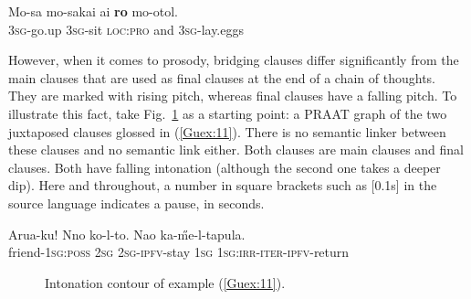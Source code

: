 \documentclass[output=paper]{LSP/langsci}
\begin{document}
\begin{exe}
\ex \label{Guex:10}
\gll Mo-sa    mo-sakai  ai \textbf{ro}  mo-otol.\\     	       
\textsc{3sg}-go.up \textsc{3sg}-sit \textsc{loc:pro}  and   \textsc{3sg}-lay.eggs\\
\glt {} \citep[][320]{guerin11}
\end{exe}

However, when it comes to prosody, bridging clauses differ significantly from the main clauses that are used as final clauses at the end of a chain of thoughts. They are marked with rising pitch, whereas final clauses have a falling pitch. To illustrate this fact, take Fig.~\ref{GuF1} as a starting point: a PRAAT graph of the two juxtaposed clauses glossed in (\ref{Guex:11}). There is no semantic linker between these clauses and no semantic link either. Both clauses are main clauses and final clauses. Both have falling intonation (although the second one takes a deeper dip). Here and throughout, a number in square brackets such as [0.1s] in the source language indicates a pause, in seconds.

\begin{exe}
\ex \label{Guex:11}
\gll Arua-ku!      Nno  ko-l-to.            Nao   ka-\H{m}e-l-tapula.\\     	       
friend-\textsc{1sg:poss}   \textsc{2sg}  \textsc{2sg-ipfv-}stay \textsc{1sg}   \textsc{1sg:irr-iter-ipfv}-return \\
\glt {} 
\end{exe}

\begin{figure}[ht]
\caption{Intonation contour of example (\ref{Guex:11}). \label{GuF1}}
\end{figure}
\end{document}
